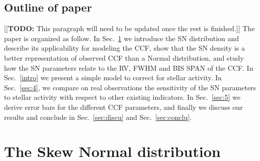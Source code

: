 \documentclass[11pt, oneside]{article}
\newcommand{\todo}[1]{{\color{cyan}[[\textbf{TODO: }#1]]}}
\begin{document}
{\subsection{Outline of paper}
\todo{This paragraph will need to be updated once the rest is finished.} The paper is organized as follow. In Sec.~\ref{sec:2} we introduce the SN distribution and describe its applicability for modeling the CCF,  show that the SN density is a better representation of observed CCF than a Normal distribution, and study how the SN parameters relate to the RV, FWHM and BIS SPAN of the CCF. In Sec.~\ref{intro} we present a simple model to correct for stellar activity. In Sec.~\ref{sec:4}, we compare on real observations the sensitivity of the SN parameters to stellar activity with respect to other existing indicators. In Sec.~\ref{sec:5} we derive error bars for the different CCF parameters, and finally we discuss our results and conclude in Sec.~\ref{sec:discu} and Sec.~\ref{sec:conclu}.



\section{The Skew Normal distribution} \label{sec:2}

}
\end{document}

